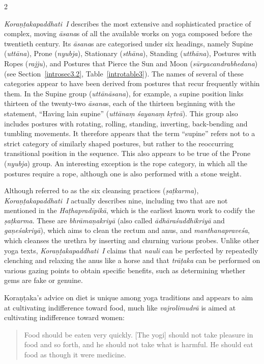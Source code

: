 \begin{nohyp}
\begin{multicols*}{2}
\begin{eng}
\emph{Koraṇṭakapaddhati~I} describes the most extensive and sophisticated practice of complex, moving \emph{āsana}s of all the available works on yoga composed before the twentieth century. Its \emph{āsana}s are categorised under six headings, namely Supine (\emph{uttāna}), Prone (\emph{nyubja}), Stationary (\emph{sthāna}), Standing (\emph{utthāna}), Postures with Ropes (\emph{rajju}), and Postures that Pierce the Sun and Moon (\emph{sūryacandrabhedana}) (see Section~\ref{introsec3.2}, Table~\ref{introtable3}). The names of several of these categories appear to have been derived from postures that recur frequently within them. In the Supine group (\emph{uttānāsana}), for example, a supine position links thirteen of the twenty-two \emph{āsana}s, each of the thirteen beginning with the statement, ``Having lain supine'' (\emph{uttānaṃ śayanaṃ kṛtvā}). This group also includes postures with rotating, rolling, standing, inverting, back-bending and tumbling movements. It therefore appears that the term ``supine'' refers not to a strict category of similarly shaped postures, but rather to the reoccurring transitional position in the sequence. This also appears to be true of the Prone (\emph{nyubja}) group. An interesting exception is the rope category, in which all the postures require a rope, although one is also performed with a stone weight.

Although referred to as the six cleansing practices (\emph{ṣaṭkarma}), \emph{Koraṇṭakapaddhati~I} actually describes nine, including two that are not mentioned in the \emph{Haṭhapradīpikā}, which is the earliest known work to codify the \emph{ṣaṭkarma}. These are \emph{bhrāmaṇakriyā} (also called \emph{ādhāraśuddhikriyā} and \emph{gaṇeśakriyā}), which aims to clean the rectum and anus, and \emph{manthanapraveśa}, which cleanses the urethra by inserting and churning various probes. Unlike other yoga texts, \emph{Koraṇṭakapaddhati~I} claims that \emph{nauli} can be perfected by repeatedly clenching and relaxing the anus like a horse and that \emph{trāṭaka} can be performed on various gazing points to obtain specific benefits, such as determining whether gems are fake or genuine.

Koraṇṭaka's advice on diet is unique among yoga traditions and appears to aim at cultivating indifference toward food, much like \emph{vajrolimudrā} is aimed at cultivating indifference toward women:

\begin{quote}
Food should be eaten very quickly. {[}The yogi{]} should not take pleasure in food and so forth, and he should not take what is harmful. He should eat food as though it were medicine.
\end{quote}


\end{eng}
\end{multicols*}
\end{nohyp}
